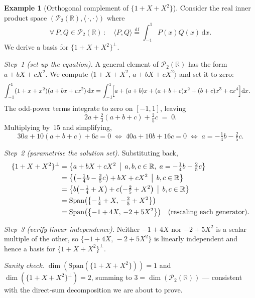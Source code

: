 \documentclass[11pt, a4paper, notitlepage]{report}
\theoremstyle{definition}
\newtheorem{example}[theorem]{Example}
\theoremstyle{remark}
\begin{document}
\begin{example}[Orthogonal complement of $\{1+X+X^2\}$]
\label{ex:orth-comp-poly}
Consider the real inner product space $(\mathscr{P}_2(\mathbb{R}),\langle\,\cdot,\cdot\,\rangle)$ where
\[
  \forall\, P,Q\in\mathscr{P}_2(\mathbb{R})\,:\quad
  \langle P,Q\rangle \stackrel{\mathrm{df}}{=} \int_{-1}^{1} P(x)Q(x)\,\mathrm{d}x.
\]
We derive a basis for $\{1+X+X^2\}^\perp$.

\smallskip
\noindent\emph{Step~1 (set up the equation).} A general element of
$\mathscr{P}_2(\mathbb{R})$ has the form $a + bX + cX^2$. We compute
$\langle 1+X+X^2,\,a+bX+cX^2\rangle$ and set it to zero:
\begin{align*}
  \int_{-1}^{1}(1+x+x^2)(a+bx+cx^2)\,\mathrm{d}x
  &= \int_{-1}^{1}\!\Bigl[a + (a+b)x + (a+b+c)x^2 + (b+c)x^3 + cx^4\Bigr]\mathrm{d}x.
\end{align*}
The odd-power terms integrate to zero on $[-1,1]$, leaving
\[
  2a + \tfrac{2}{3}(a+b+c) + \tfrac{2}{5}c \;=\; 0.
\]
Multiplying by~15 and simplifying,
\[
  30a + 10(a+b+c) + 6c = 0
  \;\Longleftrightarrow\; 40a + 10b + 16c = 0
  \;\Longleftrightarrow\; a = -\tfrac{1}{4}b - \tfrac{2}{5}c.
\]

\smallskip
\noindent\emph{Step~2 (parametrise the solution set).} Substituting back,
\begin{align*}
  \{1+X+X^2\}^\perp
    &= \bigl\{a + bX + cX^2 \,\bigm|\, a,b,c\in\mathbb{R},\;a = -\tfrac{1}{4}b - \tfrac{2}{5}c\bigr\}\\
    &= \bigl\{\bigl(-\tfrac{1}{4}b - \tfrac{2}{5}c\bigr) + bX + cX^2 \,\bigm|\, b,c\in\mathbb{R}\bigr\}\\
    &= \bigl\{b\bigl(-\tfrac{1}{4} + X\bigr) + c\bigl(-\tfrac{2}{5} + X^2\bigr) \,\bigm|\, b,c\in\mathbb{R}\bigr\}\\
    &= \mathrm{Span}\bigl(\bigl\{-\tfrac{1}{4}+X,\, -\tfrac{2}{5}+X^2\bigr\}\bigr)\\
    &= \mathrm{Span}\bigl(\bigl\{-1+4X,\, -2+5X^2\bigr\}\bigr)
    \quad\text{(rescaling each generator)}.
\end{align*}

\smallskip
\noindent\emph{Step~3 (verify linear independence).} Neither $-1+4X$ nor
$-2+5X^2$ is a scalar multiple of the other, so $\{-1+4X,\,-2+5X^2\}$ is
linearly independent and hence a basis for $\{1+X+X^2\}^\perp$.

\smallskip
\noindent\emph{Sanity check.} $\dim(\mathrm{Span}(\{1+X+X^2\})) = 1$ and
$\dim(\{1+X+X^2\}^\perp) = 2$, summing to $3 = \dim(\mathscr{P}_2(\mathbb{R}))$
--- consistent with the direct-sum decomposition we are about to prove.
\end{example}
\end{document}
